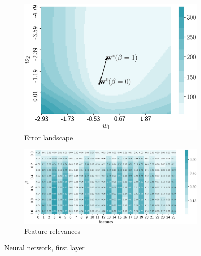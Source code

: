 \documentclass[a4paper,12pt]{article}
\theoremstyle{plain} %
\theoremstyle{definition} %
\theoremstyle{remark} %
\begin{document}
  \begin{figure}
  	\centering
  	\begin{subfigure}{.5\textwidth}
  		\centering
  		\includegraphics[width=\linewidth]{figs/neural_error.eps}
  		\caption{Error landscape}
  		\label{fig:neural_error}
  	\end{subfigure}%
  	\begin{subfigure}{.5\textwidth}
  		\centering
  		\includegraphics[width=\linewidth]{figs/neural_b_wrt_beta.eps}
  		\caption{Feature relevances}
  		\label{fig:neural_b_wrt_beta}
  	\end{subfigure}
  	\caption{Neural network, first layer}
  \end{figure}
\end{document}
